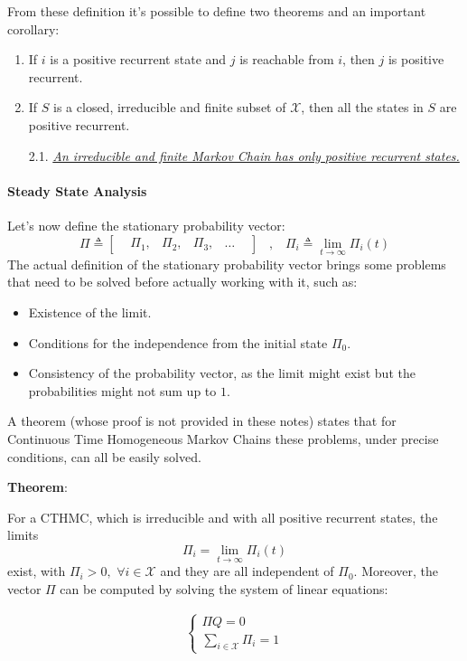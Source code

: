 \documentclass[12pt,a4paper]{article}
\begin{document}
From these definition it's possible to define two theorems and an important corollary:
\begin{enumerate}
\item If $i$ is a positive recurrent state and $j$ is reachable from $i$, then $j$ is positive recurrent.
\item If $S$ is a closed, irreducible and finite subset of $\mathcal{X}$, then all the states in $S$ are positive recurrent.
\item [2.1.] \underline{\emph{An irreducible and finite Markov Chain has only positive recurrent states.}}
\end{enumerate}
\paragraph{Steady State Analysis}
Let's now define the stationary probability vector:
$$
\Pi\triangleq \left[
\begin{matrix}
&\Pi_1,& \Pi_2,& \Pi_3,& \dots&
\end{matrix}
\right]
\hspace{10pt},\hspace{10pt}
\Pi_i\triangleq
\lim_{t\rightarrow\infty}{\Pi_i(t)}
$$ 
The actual definition of the stationary probability vector brings some problems that need to be solved before actually working with it, such as:
\begin{itemize}
\item Existence of the limit.
\item Conditions for the independence from the initial state $\Pi_0$.
\item Consistency of the probability vector, as the limit might exist but the probabilities might not sum up to $1$. 
\end{itemize}
A theorem (whose proof is not provided in these notes) states that for Continuous Time Homogeneous Markov Chains these problems, under precise conditions, can all be easily solved.

\newpage
\noindent
\textbf{Theorem}: 

\noindent
For a CTHMC, which is irreducible and with all positive recurrent states, the limits
$$
\Pi_i=
\lim_{t\rightarrow\infty}{\Pi_i(t)}
$$
exist, with $\Pi_i>0,\hspace{4pt}\forall i\in\mathcal{X}$ and they are all independent of $\Pi_0$. Moreover, the vector $\Pi$ can be computed by solving the system of linear equations:

$$
\begin{matrix}
\begin{cases}
\Pi Q=0\\
\underset{i\in\mathcal{X}}{\sum{}}{\Pi_i=1}
\end{cases}
\end{matrix}
$$
\end{document}

